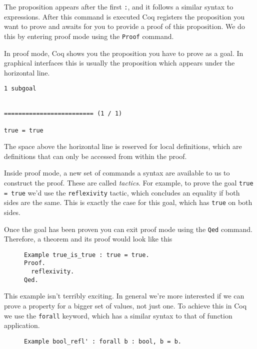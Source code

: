 The proposition appears after the first \texttt{:}, and it follows a similar syntax to 
expressions. %
After this command is executed Coq registers the proposition you want to prove and awaits for you
to provide a proof of this proposition. We do this by entering proof mode using the 
\texttt{Proof} command.

In proof mode, Coq shows you the proposition you have to prove as a goal. In graphical interfaces this
is usually the proposition which appears under the horizontal line.

\begin{verbatim}
1 subgoal


========================= (1 / 1)

true = true
\end{verbatim}

The space above the horizontal line is reserved for local definitions, which are definitions that can
only be accessed from within the proof.

Inside proof mode, a new set of commands a syntax are available to us to construct the proof. These are
called \emph{tactics}. For example, to prove the goal \texttt{true = true} we'd use the 
\texttt{reflexivity} tactic, which concludes an equality if both sides are the same. This is
exactly the case for this goal, which has \texttt{true} on both sides.

Once the goal has been proven you can exit proof mode using the \texttt{Qed} command. Therefore,
a theorem and its proof would look like this

\begin{figure}[!ht]
\begin{verbatim}
Example true_is_true : true = true.
Proof.
  reflexivity.
Qed.
\end{verbatim}
\label{lst:true-is-true}
\end{figure}

This example isn't terribly exciting. In general we're more interested if we can prove a property for a
bigger set of values, not just one. To achieve this in Coq we use the \texttt{forall} 
keyword, which has a similar syntax to that of function application.

\begin{figure}[!ht]
\begin{verbatim}
Example bool_refl' : forall b : bool, b = b.
\end{verbatim}
\label{lst:bool-eq-refl}
\end{figure}

